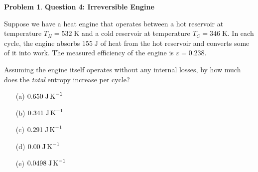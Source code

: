 \documentclass[10pt]{article}
\theoremstyle{definition} %
\newtheorem{problem}{Problem}
\theoremstyle{plain} %
\begin{document}
                                                            \begin{problem}
                                                              \textbf{Question 4: Irreversible Engine}
                                                              
                                                              Suppose we have a heat engine that operates between a hot reservoir at
                                                              temperature \(T_{H}=532\;\text{K}\) and a cold reservoir at
                                                              temperature \(T_{C}=346\;\text{K}\).
                                                              In each cycle, the engine absorbs \(155\;\text{J}\) of heat from the hot
                                                              reservoir and converts some of it into work.
                                                              The measured efficiency of the engine is \(\varepsilon = 0.238\).
                                                              
                                                              \medskip
                                                              Assuming the engine itself operates without any internal losses, by how
                                                              much does the \emph{total} entropy increase per cycle?
                                                              
                                                              \begin{enumerate}
                                                                \item[(a)] \(0.650\;\text{J\,K}^{-1}\)
                                                                \item[(b)] \(0.341\;\text{J\,K}^{-1}\)
                                                                \item[(c)] \(0.291\;\text{J\,K}^{-1}\)
                                                                \item[(d)] \(0.00\;\text{J\,K}^{-1}\)
                                                                \item[(e)] \(0.0498\;\text{J\,K}^{-1}\)
                                                              \end{enumerate}
                                                              \end{problem}
\end{document}

